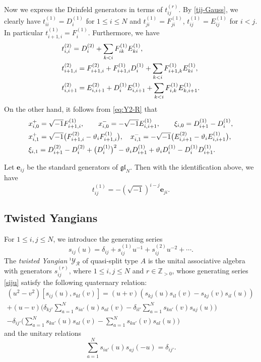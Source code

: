 \documentclass[11pt,reqno]{amsart}
\numberwithin{equation}{section}
\theoremstyle{definition}
\theoremstyle{remark}
\newcommand{\beq}{\begin{equation}}
\newcommand{\eeq}{\end{equation}}
\newcommand{\be}{\begin{equation*}}
\newcommand{\ee}{\end{equation*}}
\newcommand{\bZ}{\mathbb{Z}}
\newcommand{\gl}{\mathfrak{gl}}
\newcommand{\lle}{\leqslant}
\newcommand{\Yi}{{^\imath\mathscr{Y}}}
\begin{document}
Now we express the Drinfeld generators in terms of $t_{ij}^{(r)}$. By \eqref{tij-Gauss}, we clearly have $t_{ii}^{(1)}=D_i^{(1)}$ for $1\lle i\lle N$ and $t_{ji}^{(1)}=F_{ji}^{(1)}$, $t_{ij}^{(1)}=E_{ij}^{(1)}$ for $i<j$. In particular $t_{i+1,i}^{(1)}=F_i^{(1)}$. Furthermore, we have
\begin{align}
&t_{i,i}^{(2)}=D_i^{(2)}+\sum_{k<i}F_{ik}^{(1)}E_{ki}^{(1)},\label{eq:t-diag-used}\\
&t_{i+1,i}^{(2)}=F_{i+1,i}^{(2)}+F_{i+1,i}^{(1)}D_i^{(1)}+\sum_{k<i}F_{i+1,k}^{(1)}E_{ki}^{(1)},\notag\\
&t_{i,i+1}^{(2)}=E_{i,i+1}^{(2)}+D_i^{(1)}E_{i,i+1}^{(1)}+\sum_{k<i}F_{i,k}^{(1)}E_{k,i+1}^{(1)}.\notag
\end{align}
On the other hand, it follows from \eqref{eq:Y2-R} that
\begin{align}
&x_{i,0}^+=\sqrt{-1}F_{i+1,i}^{(1)}, \qquad x_{i,0}^-=-\sqrt{-1}E_{i,i+1}^{(1)},\qquad \xi_{i,0}=D_{i+1}^{(1)}-D_i^{(1)},\label{eq:xpm0}\\
&x_{i,1}^+=\sqrt{-1}\big(F_{i+1,i}^{(2)}-\vartheta_i F_{i+1,i}^{(1)}\big), \quad  x_{i,1}^-=-\sqrt{-1}\big(E_{i,i+1}^{(2)}-\vartheta_i E_{i,i+1}^{(1)}\big),\notag\\
&\xi_{i,1}=D_{i+1}^{(2)}-D_i^{(2)}+\big(D_{i}^{(1)}\big)^2-\vartheta_i D_{i+1}^{(1)}+\vartheta_i D_{i}^{(1)}-D_{i}^{(1)}D_{i+1}^{(1)}.\label{eq:xi1}
\end{align}

Let $\mathbf e_{ij}$ be the standard generators of $\gl_N$. Then with the identification above, we have
\[
t_{ij}^{(1)}=-(\sqrt{-1})^{i-j}\mathbf e_{ji}.
\]

\subsection{Twisted Yangians}
For $1\lle i,j\lle N$, we introduce the generating series 
\beq\label{siju}
s_{ij}(u)=  \delta_{ij}+s_{ij}^{(1)}u^{-1}+s_{ij}^{(2)}u^{-2}+\cdots.
\eeq
The \textit{twisted Yangian} $\Yi_{\mathscr R}$ of quasi-split type $A$ is the unital associative algebra  with generators $s_{ij}^{(r)}$, where $1\lle i,j\lle N$ and $r\in\bZ_{>0}$, whose generating series \eqref{siju} satisfy the following quaternary relation:
\be
\begin{split}
(u^2-v^2)[s_{ij}(u),s_{kl}(v)]=  (u+v)(s_{kj}(u)s_{il}(v)-s_{kj}(v)s_{il}(u))&\\
  + (u-v)\Big(\delta_{kj'}\sum_{a=1}^N s_{ia'}(u)s_{al}(v)-\delta_{il'}\sum_{a=1}^N s_{ka'}(v)s_{aj}(u)\Big)&\\
 - \delta_{ij'}\Big(\sum_{a=1}^N s_{ka'}(u)s_{al}(v)-\sum_{a=1}^N s_{ka'}(v)s_{al}(u)\Big)&
\end{split}
\ee
and the unitary relations
\be
\sum_{a=1}^N s_{ia'}(u)s_{aj}(-u)=\delta_{ij'}.
\ee
\end{document}
